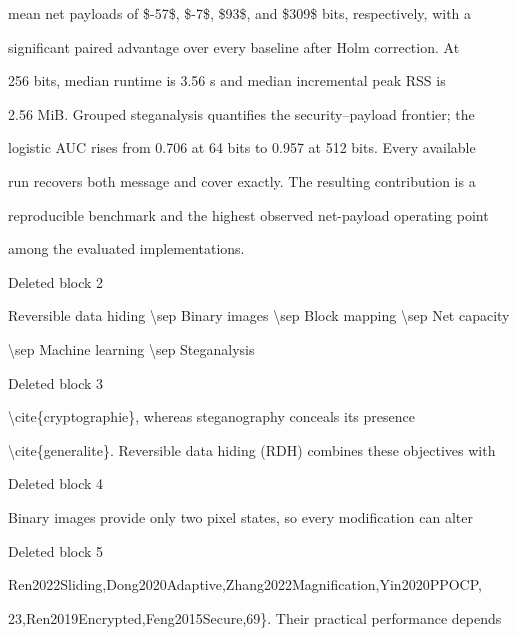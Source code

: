 \documentclass[a4paper,fleqn]{cas-dc}
\newenvironment{RevisionDeletion}{%
  \par\begingroup\color{revisionred}\footnotesize\ttfamily
  \setlength{\parindent}{0pt}\setlength{\parskip}{1pt}\obeyspaces
}{\par\endgroup}
\begin{document}
\begin{RevisionDeletion}
mean net payloads of \$-57\$, \$-7\$, \$93\$, and \$309\$ bits, respectively, with a\par
significant paired advantage over every baseline after Holm correction. At\par
256 bits, median runtime is 3.56 s and median incremental peak RSS is\par
2.56 MiB. Grouped steganalysis quantifies the security--payload frontier; the\par
logistic AUC rises from 0.706 at 64 bits to 0.957 at 512 bits. Every available\par
run recovers both message and cover exactly. The resulting contribution is a\par
reproducible benchmark and the highest observed net-payload operating point\par
among the evaluated implementations.\par
\end{RevisionDeletion}

\begin{RevisionDeletion}
Deleted block 2\par
Reversible data hiding \textbackslash{}sep Binary images \textbackslash{}sep Block mapping \textbackslash{}sep Net capacity\par
\textbackslash{}sep Machine learning \textbackslash{}sep Steganalysis\par
\end{RevisionDeletion}

\begin{RevisionDeletion}
Deleted block 3\par
\textbackslash{}cite\{cryptographie\}, whereas steganography conceals its presence\par
\textbackslash{}cite\{generalite\}. Reversible data hiding (RDH) combines these objectives with\par
\end{RevisionDeletion}

\begin{RevisionDeletion}
Deleted block 4\par
Binary images provide only two pixel states, so every modification can alter\par
\end{RevisionDeletion}

\begin{RevisionDeletion}
Deleted block 5\par
Ren2022Sliding,Dong2020Adaptive,Zhang2022Magnification,Yin2020PPOCP,\par
23,Ren2019Encrypted,Feng2015Secure,69\}. Their practical performance depends\par
\end{RevisionDeletion}
\end{document}
